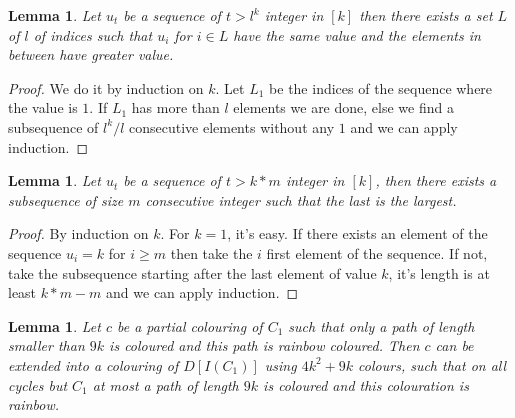 \documentclass[10pt]{article}
\theoremstyle{plain}
\newtheorem{lemma}[theorem]{Lemma}
\theoremstyle{definition}
\theoremstyle{remark}
\begin{document}
\begin{lemma}\label{min}
Let $u_t$ be a sequence of $t > l^k$ integer in $[k]$ then there exists a set $L$ of $l$ of indices such that $u_i$ for $i \in L$ have the same value 
and the elements in between have greater value. 
\end{lemma}

\begin{proof}
We do it by induction on $k$. Let $L_1$ be the indices of the sequence where the value is $1$. If $L_1$ has more than $l$ elements we are done,
else we find a subsequence of $l^k/l$ consecutive elements without any $1$ and we can apply induction. 
\end{proof} 

\begin{lemma}\label{max}
Let $u_t$ be a sequence of $t > k*m$ integer in $[k]$, then there exists a subsequence of size $m$ consecutive integer such that the 
last is the largest.
\end{lemma}

\begin{proof}
By induction on $k$. For $k = 1$, it's easy. 
If there exists an element of the sequence $u_i = k$ for $i \geq m$ then take the $i$ first element of the sequence.
If not, take the subsequence starting after the last element of value $k$, it's length is at least $k*m - m$ and we can apply induction. 
\end{proof}

\begin{lemma}\label{IC}
Let $c$ be a partial colouring of $C_1$ such that only a path of length smaller than
$9k$ is coloured and this path is rainbow coloured. Then $c$ can be extended into
a colouring of $D[I(C_1)]$ using $4k^2 + 9k$ colours, such that on all cycles but $C_1$ at most a path of length $9k$ is
coloured and this colouration is rainbow.
\end{lemma}
\end{document}
